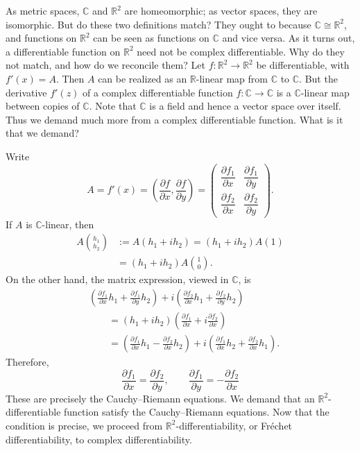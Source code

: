 \documentclass[11pt,a4paper]{article}
\begin{document}
As metric spaces, $\mathbb C$ and $\mathbb R^2$ are homeomorphic; as vector spaces, they are isomorphic. But do these two definitions match? They ought to because $\mathbb C\cong\mathbb R^2$, and functions on $\mathbb R^2$ can be seen as functions on $\mathbb C$ and vice versa. As it turns out, a differentiable function on $\mathbb R^2$ need not be complex differentiable. Why do they not match, and how do we reconcile them? Let \(f\colon\mathbb R^2\longrightarrow\mathbb R^2\)
be differentiable, with $f'(x)=A$. Then $A$ can be realized as an $\mathbb R$-linear map from $\mathbb C$ to $\mathbb C$. But the derivative $f'(z)$ of a complex differentiable function $f\colon\mathbb C\to\mathbb C$ is a $\mathbb C$-linear map between copies of $\mathbb C$. Note that $\mathbb C$ is a field and hence a vector space over itself. Thus we demand much more from a complex differentiable function. What is it that we demand?

Write
\[
A=f'(x)=\left(\frac{\partial f}{\partial x},
\frac{\partial f}{\partial y}\right)
=
\begin{pmatrix}
\dfrac{\partial f_1}{\partial x}&\dfrac{\partial f_1}{\partial y}\\[4pt]
\dfrac{\partial f_2}{\partial x}&\dfrac{\partial f_2}{\partial y}
\end{pmatrix}.
\]
If $A$ is $\mathbb C$-linear, then
\begin{align*}
A\binom{h_1}{h_2}
&:=A(h_1+ih_2)
=(h_1+ih_2)A(1)\\
&=(h_1+ih_2)A\binom10.
\end{align*}
On the other hand, the matrix expression, viewed in $\mathbb C$, is
\begin{align*}
&\left(\frac{\partial f_1}{\partial x}h_1+
\frac{\partial f_1}{\partial y}h_2\right)
+i\left(\frac{\partial f_2}{\partial x}h_1+
\frac{\partial f_2}{\partial y}h_2\right)\\
&\qquad=(h_1+ih_2)
\left(\frac{\partial f_1}{\partial x}
+i\frac{\partial f_2}{\partial x}\right)\\
&\qquad=\left(\frac{\partial f_1}{\partial x}h_1-
\frac{\partial f_2}{\partial x}h_2\right)
+i\left(\frac{\partial f_1}{\partial x}h_2+
\frac{\partial f_2}{\partial x}h_1\right).
\end{align*}
Therefore,
\[
\boxed{
\frac{\partial f_1}{\partial x}=\frac{\partial f_2}{\partial y},
\qquad
\frac{\partial f_1}{\partial y}=-\frac{\partial f_2}{\partial x}}
\]
These are precisely the Cauchy--Riemann equations. We demand that an $\mathbb R^2$-differentiable function satisfy the Cauchy--Riemann equations. Now that the condition is precise, we proceed from $\mathbb R^2$-differentiability, or Fr\'echet differentiability, to complex differentiability.
\end{document}
